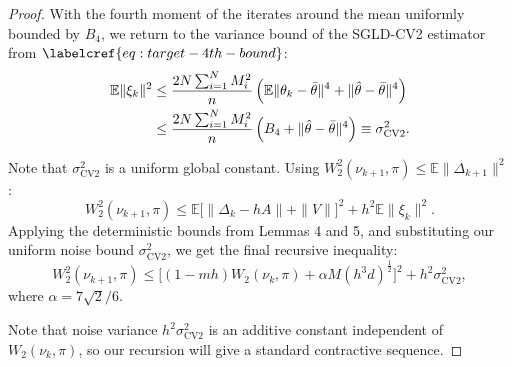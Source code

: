 \begin{proof}
With the fourth moment of the iterates around the mean uniformly bounded by $B_4$, we return to the variance bound of the SGLD-CV2 estimator from $\labelcref{eq:target-4th-bound}$:
\begin{align}
    \mathbb{E}\|\xi_k\|^2 &\leq \frac{2N \sum_{i=1}^N M_i^2}{n} \left( \mathbb{E}\|\theta_k - \bar\theta\|^4 + \|\hat\theta - \bar\theta\|^4 \right) \notag\\
    &\leq \frac{2N \sum_{i=1}^N M_i^2}{n} \left( B_4 + \|\hat\theta - \bar\theta\|^4 \right) \equiv \sigma^2_{\text{CV2}}.
\end{align}

Note that $\sigma^2_{\text{CV2}}$ is a uniform global constant. Using $W_2^2(\nu_{k+1}, \pi) \leq \mathbb{E}\|\Delta_{k+1}\|^2$:
\begin{equation}
    W_2^2(\nu_{k+1}, \pi) \leq \mathbb{E}\big[\|\Delta_k - hA\| + \|V\|\big]^2 + h^2\mathbb{E}\|\xi_k\|^2.
\end{equation}
Applying the deterministic bounds from Lemmas 4 and 5, and substituting our uniform noise bound $\sigma^2_{\text{CV2}}$, we get the final recursive inequality:
\begin{equation}\label{eq:wass-contraction}
    W_2^2(\nu_{k+1}, \pi) \leq \Big[ (1 - mh)W_2(\nu_k, \pi) + \alpha M(h^3 d)^{\frac{1}{2}} \Big]^2 + h^2 \sigma^2_{\text{CV2}},
\end{equation}
where $\alpha = 7\sqrt{2}/6$. 

Note that noise variance $h^2 \sigma^2_{\text{CV2}}$ is an additive constant independent of $W_2(\nu_k, \pi)$, so our recursion will give a standard contractive sequence.
\end{proof}

